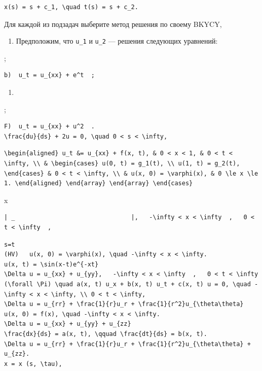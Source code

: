 \documentclass[
  ukrainian,
]{article}
\providecommand{\tightlist}{%
  \setlength{\itemsep}{0pt}\setlength{\parskip}{0pt}}
\begin{document}
\begin{verbatim}
x(s) = s + c_1, \quad t(s) = s + c_2.
\end{verbatim}

Для каждой из подзадач выберите метод решения по своему BKYCY,

\begin{enumerate}
\def\labelenumi{\arabic{enumi}.}
\setcounter{enumi}{2}
\tightlist
\item
  Предположим, что \texttt{u\_1} и \texttt{u\_2} --- решения следующих
  уравнений:
\end{enumerate}

;

\begin{verbatim}
b)  u_t = u_{xx} + e^t  ;
\end{verbatim}

\begin{enumerate}
\def\labelenumi{\Alph{enumi})}
\setcounter{enumi}{1}
\tightlist
\item
\end{enumerate}

;

\begin{verbatim}
F)  u_t = u_{xx} + u^2  .
\frac{du}{ds} + 2u = 0, \quad 0 < s < \infty,
\end{verbatim}

\begin{verbatim}
\begin{aligned} u_t &= u_{xx} + f(x, t), & 0 < x < 1, & 0 < t < \infty, \\ & \begin{cases} u(0, t) = g_1(t), \\ u(1, t) = g_2(t), \end{cases} & 0 < t < \infty, \\ & u(x, 0) = \varphi(x), & 0 \le x \le 1. \end{aligned} \end{array} \end{array} \end{cases}
\end{verbatim}

x

\begin{verbatim}
| _                                |,   -\infty < x < \infty  ,   0 < t < \infty  ,
\end{verbatim}

\begin{verbatim}
s=t
(HV)   u(x, 0) = \varphi(x), \quad -\infty < x < \infty.
u(x, t) = \sin(x-t)e^{-xt}
\Delta u = u_{xx} + u_{yy},   -\infty < x < \infty  ,   0 < t < \infty
(\forall \Pi) \quad a(x, t) u_x + b(x, t) u_t + c(x, t) u = 0, \quad -\infty < x < \infty, \\ 0 < t < \infty,
\Delta u = u_{rr} + \frac{1}{r}u_r + \frac{1}{r^2}u_{\theta\theta}
u(x, 0) = f(x), \quad -\infty < x < \infty.
\Delta u = u_{xx} + u_{yy} + u_{zz}
\frac{dx}{ds} = a(x, t), \qquad \frac{dt}{ds} = b(x, t).
\Delta u = u_{rr} + \frac{1}{r}u_r + \frac{1}{r^2}u_{\theta\theta} + u_{zz}.
x = x (s, \tau),
\end{verbatim}
\end{document}
